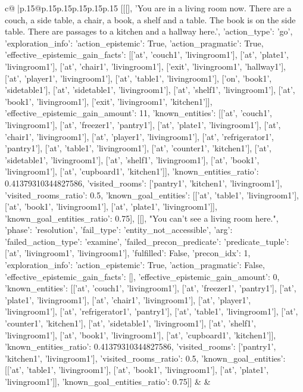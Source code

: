 \documentclass{article}
\begin{document}
{\begin{supertabular}{c@{$\;$}|p{.15\linewidth}@{}p{.15\linewidth}p{.15\linewidth}p{.15\linewidth}p{.15\linewidth}p{.15\linewidth}}
{{{	 [[[], 'You are in a living room now. There are a couch, a side table, a chair, a book, a shelf and a table. The book is on the side table. There are passages to a kitchen and a hallway here.', {'action_type': 'go', 'exploration_info': {'action_epistemic': True, 'action_pragmatic': True, 'effective_epistemic_gain_facts': [['at', 'couch1', 'livingroom1'], ['at', 'plate1', 'livingroom1'], ['at', 'chair1', 'livingroom1'], ['exit', 'livingroom1', 'hallway1'], ['at', 'player1', 'livingroom1'], ['at', 'table1', 'livingroom1'], ['on', 'book1', 'sidetable1'], ['at', 'sidetable1', 'livingroom1'], ['at', 'shelf1', 'livingroom1'], ['at', 'book1', 'livingroom1'], ['exit', 'livingroom1', 'kitchen1']], 'effective_epistemic_gain_amount': 11, 'known_entities': [['at', 'couch1', 'livingroom1'], ['at', 'freezer1', 'pantry1'], ['at', 'plate1', 'livingroom1'], ['at', 'chair1', 'livingroom1'], ['at', 'player1', 'livingroom1'], ['at', 'refrigerator1', 'pantry1'], ['at', 'table1', 'livingroom1'], ['at', 'counter1', 'kitchen1'], ['at', 'sidetable1', 'livingroom1'], ['at', 'shelf1', 'livingroom1'], ['at', 'book1', 'livingroom1'], ['at', 'cupboard1', 'kitchen1']], 'known_entities_ratio': 0.41379310344827586, 'visited_rooms': ['pantry1', 'kitchen1', 'livingroom1'], 'visited_rooms_ratio': 0.5, 'known_goal_entities': [['at', 'table1', 'livingroom1'], ['at', 'book1', 'livingroom1'], ['at', 'plate1', 'livingroom1']], 'known_goal_entities_ratio': 0.75}}], [[], "You can't see a living room here.", {'phase': 'resolution', 'fail_type': 'entity_not_accessible', 'arg': {'failed_action_type': 'examine', 'failed_precon_predicate': {'predicate_tuple': ['at', 'livingroom1', 'livingroom1'], 'fulfilled': False, 'precon_idx': 1}}, 'exploration_info': {'action_epistemic': True, 'action_pragmatic': False, 'effective_epistemic_gain_facts': [], 'effective_epistemic_gain_amount': 0, 'known_entities': [['at', 'couch1', 'livingroom1'], ['at', 'freezer1', 'pantry1'], ['at', 'plate1', 'livingroom1'], ['at', 'chair1', 'livingroom1'], ['at', 'player1', 'livingroom1'], ['at', 'refrigerator1', 'pantry1'], ['at', 'table1', 'livingroom1'], ['at', 'counter1', 'kitchen1'], ['at', 'sidetable1', 'livingroom1'], ['at', 'shelf1', 'livingroom1'], ['at', 'book1', 'livingroom1'], ['at', 'cupboard1', 'kitchen1']], 'known_entities_ratio': 0.41379310344827586, 'visited_rooms': ['pantry1', 'kitchen1', 'livingroom1'], 'visited_rooms_ratio': 0.5, 'known_goal_entities': [['at', 'table1', 'livingroom1'], ['at', 'book1', 'livingroom1'], ['at', 'plate1', 'livingroom1']], 'known_goal_entities_ratio': 0.75}}]] 
	  } 
	   } 
	   } 
	 & & \\ 
 


\end{supertabular}}
\end{document}
